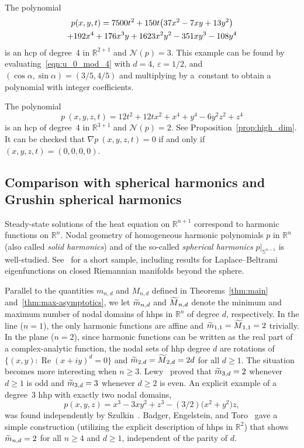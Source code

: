 \documentclass[AHL,Unicode,longabstracts,published]{cedram}
\DeclareMathOperator{\Ree}{Re}
\newcommand{\R}{\mathbb{R}}
\newcommand{\sphere}{\mathbb{S}}
\newcommand{\nodal}{\mathcal{N}}
\renewcommand{\epsilon}{\varepsilon}
\let\oldtilde\tilde
\renewcommand*{\tilde}[1]{\mathchoice{\widetilde{#1}}{\widetilde{#1}}{\oldtilde{#1}}{\oldtilde{#1}}}
\let\originalleft\left
\let\originalright\right
\renewcommand{\left}{\mathopen{}\mathclose\bgroup\originalleft}
\renewcommand{\right}{\aftergroup\egroup\originalright}
\newcommand{\R}{\mathbb{R}}
\begin{document}
\begin{exam}\label{eq:n2d4}
The polynomial
\begin{multline}
p(x,y,t)=7500 t^2 + 150t\left(37x^2-7xy+13y^2\right) \\
+ 192 x^4 + 176 x^3 y + 1623 x^2 y^2 - 351 x y^3 - 108 y^4
\end{multline}
is an hcp of degree~4 in $\R^{2+1}$ and $\nodal(p)=3$. This example can be found by evaluating~\eqref{eqn:u_0_mod_4} with $d=4$, $\epsilon=1/2$, and $(\cos\alpha,\sin\alpha)=(3/5,4/5)$ and multiplying by a~constant to obtain a polynomial with integer coefficients.
\end{exam}

\begin{exam}\label{eq:n3d4}
The polynomial
\begin{equation}
p~(x,y,z,t)=12t^2+12tx^2+x^4+y^4-6y^2z^2+z^4
\end{equation}
is an hcp of degree~4 in $\R^{3+1}$ and $\nodal(p)=2$. See Proposition~\ref{prop:high_dim}. It can be checked that $\nabla p~(x,y,z,t)=0$ if and only if $(x,y,z,t)=(0,0,0,0)$.
\end{exam}

\subsection{Comparison with spherical harmonics and Grushin spherical harmonics}\label{ss:harmonic}

Steady-state solutions of the heat equation on $\R^{n+1}$ correspond to harmonic functions on $\R^n$. Nodal geometry of homogeneous harmonic polynomials $p$ in $\R^n$ (also called \emph{solid harmonics}) and of the so-called \emph{spherical harmonics} $p|_{\sphere^{n-1}}$ is well-studied. See~\cite{EJN07, Logunov-annals1,Logunov-annals2,NS09} for a short sample, including results for Laplace--Beltrami eigenfunctions on closed Riemannian manifolds beyond the sphere.

Parallel to the quantities $m_{n,d}$ and $M_{n,d}$ defined in Theorems~\ref{thm:main} and~\ref{thm:max-asymptotics}, we let $\tilde m_{n,d}$ and $\tilde M_{n,d}$ denote the minimum and maximum number of nodal domains of hhps in $\R^n$ of degree $d$, respectively. In the line ($n=1$), the only harmonic functions are affine and $\tilde m_{1,1}=\tilde M_{1,1}=2$ trivially. In the plane ($n=2$), since harmonic functions can be written as the real part of a complex-analytic function, the nodal sets of hhp degree $d$ are rotations of $\{(x,y):\Ree(x+iy)^d=0\}$ and $\tilde m_{2,d}=\tilde M_{2,d}=2d$ for all $d\geq 1$. The situation becomes more interesting when $n\geq 3$. Lewy~\cite{Lewy77} proved that $\tilde m_{3,d}=2$ whenever $d\geq 1$ is odd and $\tilde m_{3,d}=3$ whenever $d\geq 2$ is even. An explicit example of a degree~3 hhp with exactly two nodal domains,
\begin{equation}
p(x,y,z) = x^3 - 3xy^2 + z^3 - (3/2)\bigl(x^2 + y^2\bigr)z,
\end{equation}
was found independently by Szulkin~\cite{Szulkin78}. Badger, Engelstein, and Toro~\cite{BET17} gave a simple construction (utilizing the explicit description of hhps in $\R^2$) that shows $\tilde m_{n,d}=2$ for all $n\geq 4$ and $d\geq 1$, independent of the parity of $d$.
\end{document}
